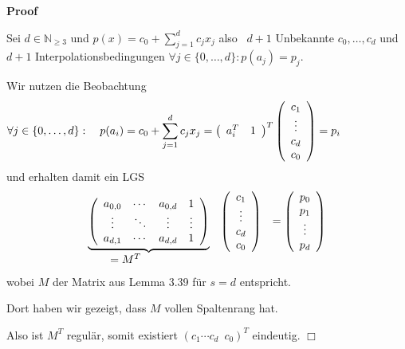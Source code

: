 \documentclass{book}
\newenvironment{proof}{\noindent\textbf{Proof\ }}{\hspace*{\fill}$\Box$\medskip}
\begin{document}
\begin{proof}
  \
  
  Sei $d \in \mathbb{N}_{\geqslant 3}$ und $p (x) = c_0 + \sum_{j = 1}^d c_j
  x_j$ also \ $d + 1$ Unbekannte $c_0, \ldots, c_d$ und $d + 1$
  Interpolationsbedingungen $\forall j \in \{ 0, \ldots, d \} : p (a_j) =
  p_j$.
  
  Wir nutzen die Beobachtung
  \[ \forall j \in \{ 0, \ldots, d \} : \text{\quad} p (a_i) = c_0 + \sum_{j
     = 1}^d c_j x_j = \left(\begin{array}{cc}
       a_i^T & 1
     \end{array}\right)^T \left(\begin{array}{c}
       c_1\\
       \vdots\\
       c_d\\
       c_0
     \end{array}\right) = p_i \text{{\hspace{6em}}} \]
  und erhalten damit ein LGS
  \[ \begin{array}{lll}
       \underbrace{\left(\begin{array}{cccc}
         a_{0, 0} & \cdots & a_{0, d} & 1\\
         \vdots & \ddots & \vdots & \vdots\\
         a_{d, 1} & \cdots & a_{d, d} & 1
       \end{array}\right)} & \left(\begin{array}{c}
         c_1\\
         \vdots\\
         c_d\\
         c_0
       \end{array}\right) & = \left(\begin{array}{c}
         p_0\\
         p_1\\
         \vdots\\
         p_d
       \end{array}\right)\\
       \text{{\hspace{1.7em}}} = M^T &  & 
     \end{array} \]
  wobei $M$ der Matrix aus Lemma 3.39 f{\"u}r $s = d$ entspricht.
  
  Dort haben wir gezeigt, dass $M$ vollen Spaltenrang hat.
  
  Also ist $M^T$ regul{\"a}r, somit existiert $\left( c_1 \cdots c_d \enspace
  {c_0}  \right)^T$ eindeutig. 
\end{proof}
\end{document}
